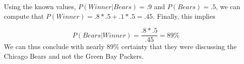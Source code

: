 \begin{flushleft}Using the known values, \begin{math}P(Winner|Bears)=.9\end{math} and \begin{math}P(Bears)=.5\end{math}, we can compute that \begin{math}P(Winner)=.8*.5+.1*.5=.45\end{math}. Finally, this implies
\end{flushleft}
\begin{equation}
P(Bears|Winner)=\frac{.8*.5}{.45}=89\%
\end{equation}
We can thus conclude with nearly 89\% certainty that they were discussing the Chicago Bears and not the Green Bay Packers.






